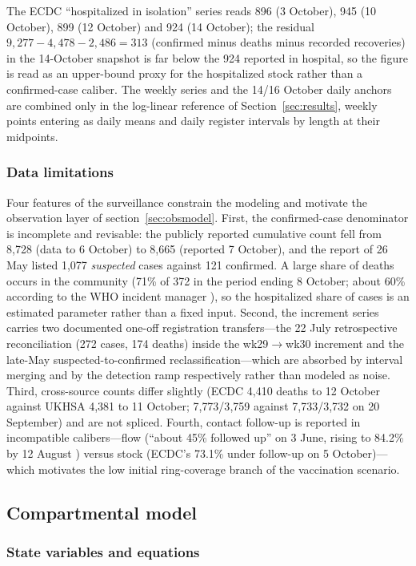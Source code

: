 \documentclass[preprint,12pt,numbers]{elsarticle}
\begin{document}
The ECDC ``hospitalized in isolation'' series reads 896 (3 October), 945
(10 October), 899 (12 October) and 924 (14 October); the
residual $9{,}277-4{,}478-2{,}486=313$ (confirmed minus deaths minus
recorded recoveries) in the 14-October snapshot is far below the 924
reported in hospital, so the figure is read as an upper-bound proxy for
the hospitalized stock rather than a confirmed-case caliber. The weekly
series and the 14/16 October daily anchors are combined only in the
log-linear reference of Section~\ref{sec:results}, weekly points
entering as daily means and daily register intervals by length at their
midpoints.
\subsubsection{Data limitations}\label{sec:caliber}

Four features of the surveillance constrain the modeling and motivate
the observation layer of section~\ref{sec:obsmodel}. First, the
confirmed-case denominator is incomplete and revisable: the publicly
reported cumulative count fell from 8{,}728 (data to 6 October) to
8{,}665 (reported 7 October), and the report of 26 May listed 1{,}077
\emph{suspected} cases against 121 confirmed. A large share of deaths
occurs in the community (71\% of 372 in the period ending 8 October; about 60\% according to the WHO incident manager
), so the hospitalized share of cases is an estimated
parameter rather than a fixed input. Second, the increment series carries
two documented one-off registration transfers---the 22 July
retrospective reconciliation (272 cases, 174 deaths) inside the
wk29$\to$wk30 increment and the late-May suspected-to-confirmed
reclassification---which are absorbed by interval merging and by the
detection ramp respectively rather than modeled as noise. Third,
cross-source counts differ slightly (ECDC 4{,}410 deaths to 12 October
against UKHSA 4{,}381 to 11 October; 7{,}773/3{,}759 against
7{,}733/3{,}732 on 20 September) and are not spliced. Fourth, contact
follow-up is reported in incompatible calibers---flow (``about 45\%
followed up'' on 3 June, rising to 84.2\% by 12 August
) versus stock (ECDC's 73.1\% under
follow-up on 5 October)---which motivates the low
initial ring-coverage branch of the vaccination scenario.
\subsection{Compartmental model}\label{sec:model}

\subsubsection{State variables and equations}
\end{document}
